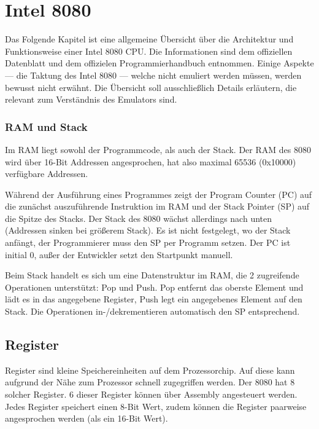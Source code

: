 \section{Intel 8080}

Das Folgende Kapitel ist eine allgemeine Übersicht über die Architektur und Funktionsweise einer Intel 8080 CPU. Die Informationen sind dem offiziellen Datenblatt\cite{datasheet} und dem offizielen Programmierhandbuch\cite{progManual} entnommen.
Einige Aspekte --- \zB die Taktung des Intel 8080 --- welche nicht emuliert werden müssen, werden bewusst nicht erwähnt. Die Übersicht soll ausschließlich Details erläutern, die relevant zum Verständnis des Emulators sind.

\subsubsection{RAM und Stack}

Im \ac{RAM} liegt sowohl der Programmcode, als auch der Stack.
Der \ac{RAM} des 8080 wird über 16-Bit Addressen angesprochen, hat also maximal 65536 (0x10000) verfügbare Addressen.

Während der Ausführung eines Programmes zeigt der Program Counter (PC) auf die zunächst auszuführende Instruktion im \ac{RAM} und der Stack Pointer (SP) auf die Spitze des Stacks. Der Stack des 8080 wächst allerdings nach unten (Addressen sinken bei größerem Stack).
Es ist nicht festgelegt, wo der Stack anfängt, der Programmierer muss den SP per Programm setzen. Der PC ist initial 0, außer der Entwickler setzt den Startpunkt manuell.

Beim Stack handelt es sich um eine Datenstruktur im \ac{RAM}, die 2 zugreifende Operationen unterstützt: Pop und Push. Pop entfernt das oberste Element und lädt es in das angegebene Register, Push legt ein angegebenes Element auf den Stack. Die Operationen in-/dekrementieren automatisch den SP entsprechend.

\subsection{Register}

Register sind kleine Speichereinheiten auf dem Prozessorchip. Auf diese kann aufgrund der Nähe zum Prozessor schnell zugegriffen werden. Der 8080 hat 8 solcher Register.
6 dieser Register können über Assembly angesteuert werden. Jedes Register speichert einen 8-Bit Wert, zudem können die Register paarweise angesprochen werden (als ein 16-Bit Wert).

